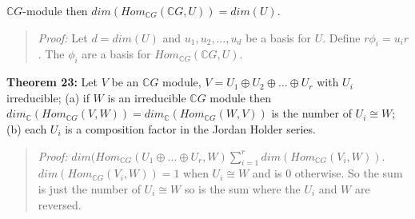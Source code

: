 {${\mathbb C}G$-module then 
$dim(Hom_{{\mathbb C}G}({\mathbb C}G, U))= dim(U)$.
\begin{quote}
\emph{Proof:}  
Let $d=dim(U)$ and $u_1, u_2, \ldots, u_d$ be a basis for $U$.  Define
$r \phi_i=u_i r$.  The $\phi_i$ are a basis for $Hom_{{\mathbb C}G}({\mathbb C}G, U)$.
\end{quote}
{\bf Theorem 23:}
Let $V$ be an ${\mathbb C}G$ module, 
$V= U_1 \oplus U_2 \oplus \ldots \oplus U_r$ with $U_i$ irreducible; (a) if
$W$ is an irreducible ${\mathbb C} G$ module then 
$dim_{{\mathbb C}}(Hom_{{\mathbb C}G}(V, W))= dim_{{\mathbb C}}(Hom_{{\mathbb C}G}(W, V))$ is
the number of $U_i \cong W$;
(b) each $U_i$ is a composition factor in the Jordan Holder series.
\begin{quote}
\emph{Proof:}  
$dim(Hom_{{\mathbb C}G}(U_1 \oplus \ldots \oplus U_r, W)
\sum_{i=1}^{r} dim(Hom_{{\mathbb C}G}(V_i , W))$. 
$dim(Hom_{{\mathbb C}G}(V_i , W))= 1$ when $U_i \cong W$ and is $0$ otherwise.  So the
sum is just the number of $U_i \cong W$ so is the sum where the $U_i$ and $W$ are reversed.
\end{quote}
}

